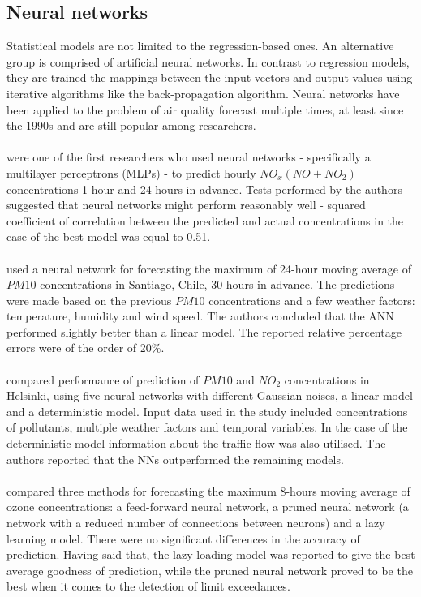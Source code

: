 \subsection{Neural networks}
Statistical models are not limited to the regression-based ones. An alternative group is comprised of artificial neural networks. In contrast to regression models, they are trained the mappings between the input vectors and output values using iterative algorithms like the back-propagation algorithm. Neural networks have been applied to the problem of air quality forecast multiple times, at least since the 1990s and are still popular among researchers.
\\\\
\cite{GARDNER1999709} were one of the first researchers who used neural networks - specifically a multilayer perceptrons (MLPs) - to predict hourly $NO_x (NO + NO_2)$ concentrations 1 hour and 24 hours in advance. Tests performed by the authors suggested that neural networks might perform reasonably well - squared coefficient of correlation between the predicted and actual concentrations in the case of the best model was equal to 0.51.
\\\\
\cite{PEREZ20024555} used a neural network for forecasting the maximum of  24-hour moving average of $PM10$ concentrations in Santiago, Chile, 30 hours in advance. The predictions were made based on the previous $PM10$ concentrations and a few weather factors: temperature, humidity and wind speed. The authors concluded that the ANN performed slightly better than a linear model. The reported relative percentage errors were of the order of 20\%.
\\\\
\cite{KUKKONEN2003} compared performance of prediction of $PM10$ and $NO_2$ concentrations in Helsinki, using five neural networks with different Gaussian noises, a linear model and a deterministic model. Input data used in the study included concentrations of pollutants, multiple weather factors and temporal variables. In the case of the deterministic model information about the traffic flow was also utilised. The authors reported that the NNs outperformed the remaining models.
\\\\
\cite{CORANI2005513} compared three methods for forecasting the maximum  8-hours moving average of ozone concentrations: a feed-forward neural network, a pruned neural network (a network with a reduced number of connections between neurons) and a lazy learning model. There were no significant differences in the accuracy of prediction. Having said that, the lazy loading model was reported to give the best average goodness of prediction, while the pruned neural network proved to be the best when it comes to the detection of limit exceedances.
